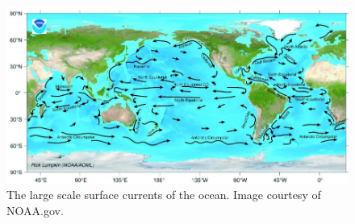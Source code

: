 \begin{figure}%
  \begin{center}
    \includegraphics[scale=0.65]{Figures/WindDrivenCurrentsNOAA.pdf}%
    \caption{The large scale surface currents of the ocean. Image courtesy of
      NOAA.gov.}
    \label{fig:Currents}
  \end{center}
\end{figure}

